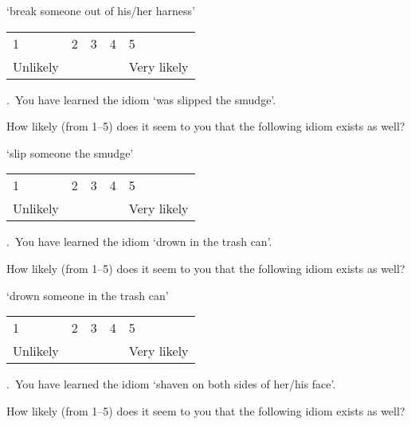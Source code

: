 \documentclass[output=paper]{langsci/langscibook}
\begin{document}
\begin{paperappendix}
\noindent \enquote*{{break someone out of his/her harness}}\vspace{.5\baselineskip}

\noindent \begin{tabularx}{\textwidth}{XXXXX}
    1 & 2 & 3 & 4 & 5\\
    Unlikely & & & & Very likely\\
\end{tabularx}\vspace{1\baselineskip}

.\ You have learned the idiom \enquote*{{was slipped the smudge}}.

\noindent How likely (from 1--5) does it seem to you that the following idiom exists
    as well?\vspace{.5\baselineskip}

\noindent \enquote*{{slip someone the smudge}}\vspace{.5\baselineskip}

\noindent \begin{tabularx}{\textwidth}{XXXXX}
        1 & 2 & 3 & 4 & 5\\
        Unlikely & & & & Very likely\\
        \end{tabularx}\vspace{1\baselineskip}


.\ You have learned the idiom \enquote*{{drown in the trash can}}.

\noindent How likely (from 1--5) does it seem to you that the following idiom exists
    as well?\vspace{.5\baselineskip}

\noindent \enquote*{{drown someone in the trash can}}\vspace{.5\baselineskip}

\noindent \begin{tabularx}{\textwidth}{XXXXX}
        1 & 2 & 3 & 4 & 5\\
        Unlikely & & & & Very likely\\
        \end{tabularx}\vspace{1\baselineskip}


.\ You have learned the idiom \enquote*{{shaven on both sides of
    her/his face}}.

\noindent How likely (from 1--5) does it seem to you that the following idiom exists
    as well?\vspace{.5\baselineskip}


\end{paperappendix}
\end{document}
